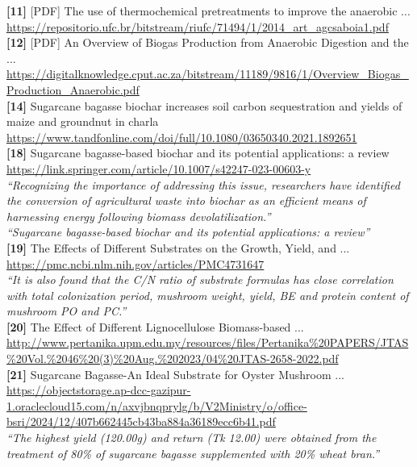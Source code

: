\textbf{[11]} [PDF] The use of thermochemical pretreatments to improve the anaerobic ...\\[0.15em]
\url{https://repositorio.ufc.br/bitstream/riufc/71494/1/2014_art_agcsaboia1.pdf}\\[0.2em]

\textbf{[12]} [PDF] An Overview of Biogas Production from Anaerobic Digestion and the ...\\[0.15em]
\url{https://digitalknowledge.cput.ac.za/bitstream/11189/9816/1/Overview_Biogas_Production_Anaerobic.pdf}\\[0.2em]

\textbf{[14]} Sugarcane bagasse biochar increases soil carbon sequestration and yields of maize and groundnut in charla\\[0.15em]
\url{https://www.tandfonline.com/doi/full/10.1080/03650340.2021.1892651}\\[0.2em]

\textbf{[18]} Sugarcane bagasse-based biochar and its potential applications: a review\\[0.15em]
\url{https://link.springer.com/article/10.1007/s42247-023-00603-y}\\[0.2em]
\emph{``Recognizing the importance of addressing this issue, researchers have identified the conversion of agricultural waste into biochar as an efficient means of harnessing energy following biomass devolatilization.''}\\[0.45em]
\emph{``Sugarcane bagasse-based biochar and its potential applications: a review''}\\[0.45em]

\textbf{[19]} The Effects of Different Substrates on the Growth, Yield, and ...\\[0.15em]
\url{https://pmc.ncbi.nlm.nih.gov/articles/PMC4731647}\\[0.2em]
\emph{``It is also found that the C/N ratio of substrate formulas has close correlation with total colonization period, mushroom weight, yield, BE and protein content of mushroom PO and PC.''}\\[0.45em]

\textbf{[20]} The Effect of Different Lignocellulose Biomass-based ...\\[0.15em]
\url{http://www.pertanika.upm.edu.my/resources/files/Pertanika\%20PAPERS/JTAS\%20Vol.\%2046\%20(3)\%20Aug.\%202023/04\%20JTAS-2658-2022.pdf}\\[0.2em]

\textbf{[21]} Sugarcane Bagasse-An Ideal Substrate for Oyster Mushroom ...\\[0.15em]
\url{https://objectstorage.ap-dcc-gazipur-1.oraclecloud15.com/n/axvjbnqprylg/b/V2Ministry/o/office-bsri/2024/12/407b662445cb43ba884a36189ecc6b41.pdf}\\[0.2em]
\emph{``The highest yield (120.00g) and return (Tk 12.00) were obtained from the treatment of 80\% of sugarcane bagasse supplemented with 20\% wheat bran.''}\\[0.45em]

